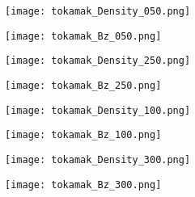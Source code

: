 \begin{figure}[htbp]
	\centering
	
	\vspace{-5mm}
	\hspace{-6mm}
	\begin{subfigure}{0.26\textwidth}
		\texttt{[image: tokamak\_Density\_050.png]}
	\end{subfigure}
	\hspace{-4mm} %
	\begin{subfigure}{0.26\textwidth}
		\texttt{[image: tokamak\_Bz\_050.png]}
	\end{subfigure}
	\hspace{2mm} %
	\begin{subfigure}{0.26\textwidth}
		\texttt{[image: tokamak\_Density\_250.png]}
	\end{subfigure}
	\hspace{-4mm} %
	\begin{subfigure}{0.26\textwidth}
		\texttt{[image: tokamak\_Bz\_250.png]}
	\end{subfigure}
	\hspace{-6mm}
	
	\vspace{-6mm} %
	
	\hspace{-6mm}
	\begin{subfigure}{0.26\textwidth}
		\texttt{[image: tokamak\_Density\_100.png]}
	\end{subfigure}
	\hspace{-4mm} %
	\begin{subfigure}{0.26\textwidth}
		\texttt{[image: tokamak\_Bz\_100.png]}
	\end{subfigure}
	\hspace{2mm} %
	\begin{subfigure}{0.26\textwidth}
		\texttt{[image: tokamak\_Density\_300.png]}
	\end{subfigure}
	\hspace{-4mm} %
	\begin{subfigure}{0.26\textwidth}
		\texttt{[image: tokamak\_Bz\_300.png]}
	\end{subfigure}
	\hspace{-5mm}
	

\end{figure}
